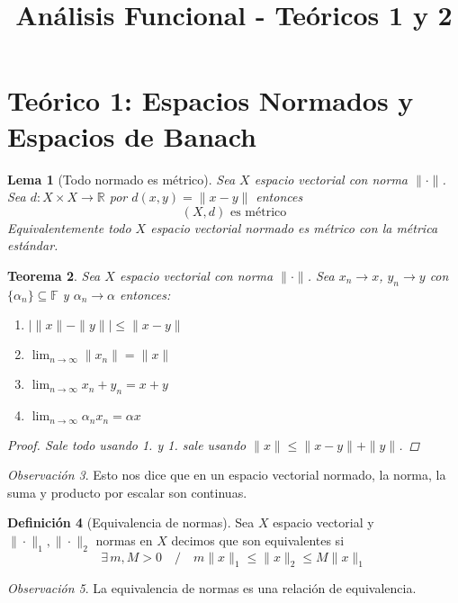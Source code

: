 \documentclass[12pt,a4paper]{article}
\title{Análisis Funcional - Teóricos 1 y 2}
\author{}
\date{}
\newtheorem{theorem}{Teorema}[section]
\newtheorem{lemma}[theorem]{Lema}
\theoremstyle{definition}
\newtheorem{definition}[theorem]{Definición}
\theoremstyle{remark}
\newtheorem{remark}[theorem]{Observación}
\begin{document}
\maketitle

\section{Teórico 1: Espacios Normados y Espacios de Banach}

\begin{lemma}[Todo normado es métrico]
Sea $X$ espacio vectorial con norma $\|\cdot\|$. Sea $d:X\times X\rightarrow \mathbb{R}$ por $d(x,y)=\|x-y\|$ entonces
$$(X,d)\text{ es métrico}$$
Equivalentemente todo $X$ espacio vectorial normado es métrico con la métrica estándar.
\end{lemma}

\begin{theorem}
Sea $X$ espacio vectorial con norma $\|\cdot\|$. Sea $x_n\rightarrow x$, $y_n\rightarrow y$ con $\{\alpha_n\}\subseteq \mathbb{F}$ y $\alpha_n\rightarrow\alpha$ entonces:
\begin{enumerate}
    \item $\big|\|x\| -\|y\|\big|\leq \|x-y\|$
    \item $\lim_{n \to \infty}\|x_n\|=\|x\|$
    \item $\lim_{n \to \infty}x_n+y_n=x+y$
    \item $\lim_{n \to \infty}\alpha_n x_n=\alpha x$
\end{enumerate}
\begin{proof}
Sale todo usando 1. y 1. sale usando $\|x\|\leq \|x-y\|+\|y\|$.
\end{proof}
\end{theorem}

\begin{remark}
Esto nos dice que en un espacio vectorial normado, la norma, la suma y producto por escalar son continuas.
\end{remark}

\begin{definition}[Equivalencia de normas]
Sea $X$ espacio vectorial y $\|\cdot\|_1,\|\cdot\|_2$ normas en $X$ decimos que son equivalentes si 
$$\exists\, m,M>0\quad /\quad m\|x\|_1\leq \|x\|_2\leq M\|x\|_1$$
\end{definition}

\begin{remark}
La equivalencia de normas es una relación de equivalencia.
\end{remark}
\end{document}
